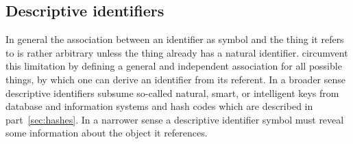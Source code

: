 \subsection{Descriptive identifiers}
\label{sec:descrids}

In general the association between an identifier as symbol and the thing 
it refers to is rather arbitrary unless the thing already has a natural
identifier.  circumvent this limitation by
defining a general and independent association for all possible things, 
by which one can derive an identifier from its referent. In a broader sense
descriptive identifiers subsume so-called natural, smart, or intelligent 
keys from database and information systems and hash codes which are described
in part~\ref{sec:hashes}. In a narrower sense a descriptive identifier symbol
must reveal some information about the object it references.


